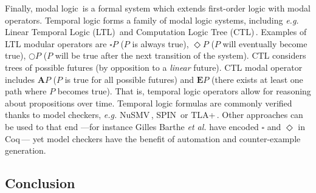 Finally, modal logic\,\cite{chagrov1997modal} is a formal system which extends
first-order logic with modal operators.
%
Temporal logic forms a family of modal logic systems, including \emph{e.g.}
Linear Temporal Logic (LTL)\,\cite{sistla1985ltl} and Computation Logic Tree
(CTL)\,\cite{clarke1981ctl}.
%
Examples of LTL modular operators are \( \square P \) (\( P \) is always true),
\( \Diamond P \) (\( P \) will eventually become true), \( \bigcirc P \)
(\( P \) will be true after the next transition of the system).
%
CTL considers trees of possible futures (by opposition to a \emph{linear}
future).
%
CTL modal operator includes \( \mathbf{A} P \) (\( P \) is true for all possible
futures) and \( \mathbf{E} P \) (there exists at least one path where \( P \)
becomes true).
%
That is, temporal logic operators allow for reasoning about propositions over
time.
%
Temporal logic formulas are commonly verified thanks to model checkers,
\emph{e.g.}  NuSMV\,\cite{cimatti2002nusmv}, SPIN\,\cite{holzmann1997spin} or
TLA+\,\cite{lamport2002tla}.
%
Other approaches can be used to that end ---for instance Gilles Barthe \emph{et
  al.} have encoded \( \square \) and \( \Diamond \) in
Coq\,\cite{barthe2011virtcert1}--- yet model checkers have the benefit of
automation and counter-example generation.


\subsection{Conclusion}

